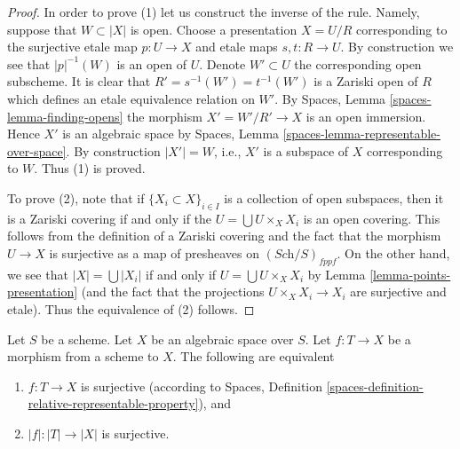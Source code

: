 \begin{proof}
In order to prove (1) let us construct the inverse of the rule.
Namely, suppose that $W \subset |X|$ is open. Choose a presentation
$X = U/R$ corresponding to the surjective etale map
$p : U \to X$ and etale maps $s, t : R \to U$.
By construction we see that $|p|^{-1}(W)$ is an
open of $U$. Denote $W' \subset U$ the corresponding open subscheme.
It is clear that $R' = s^{-1}(W') = t^{-1}(W')$ is a Zariski open
of $R$ which defines an etale equivalence relation on $W'$.
By Spaces, Lemma \ref{spaces-lemma-finding-opens} the morphism
$X' = W'/R' \to X$ is an open immersion. Hence $X'$ is an algebraic space
by Spaces, Lemma \ref{spaces-lemma-representable-over-space}.
By construction $|X'| = W$, i.e., $X'$ is a subspace of $X$
corresponding to $W$. Thus (1) is proved.

\medskip\noindent
To prove (2), note that if $\{X_i \subset X\}_{i \in I}$ is a collection
of open subspaces, then it is a Zariski covering if and only if the
$U = \bigcup U \times_X X_i$ is an open covering. This follows from
the definition of a Zariski covering and the fact that the morphism
$U \to X$ is surjective as a map of presheaves on $(\textit{Sch}/S)_{fppf}$.
On the other hand, we see that $|X| = \bigcup |X_i|$ if and only if
$U = \bigcup U \times_X X_i$ by Lemma \ref{lemma-points-presentation}
(and the fact that the projections $U \times_X X_i \to X_i$ are surjective
and etale). Thus the equivalence of (2) follows.
\end{proof}

\begin{lemma}
\label{lemma-characterize-surjective}
Let $S$ be a scheme.
Let $X$ be an algebraic space over $S$.
Let $f : T \to X$ be a morphism from a scheme to $X$.
The following are equivalent
\begin{enumerate}
\item $f : T \to X$ is surjective (according to
Spaces, Definition \ref{spaces-definition-relative-representable-property}),
and
\item $|f| : |T| \to |X|$ is surjective.
\end{enumerate}
\end{lemma}

